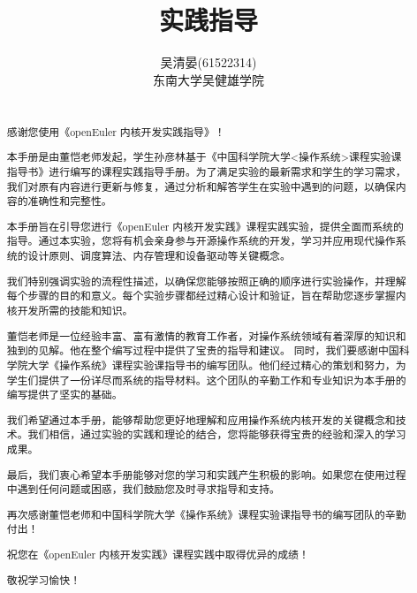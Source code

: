 \documentclass{article}
\title{实践指导}
\author{吴清晏(61522314) \\ 东南大学吴健雄学院}
\date{}
\begin{document}
\maketitle

\newpage
\renewcommand{\abstractname}{\LARGE\textbf{前言}}
\begin{abstract}\large

	~\\
	感谢您使用《openEuler 内核开发实践指导》！

	本手册是由董恺老师发起，学生孙彦林基于《中国科学院大学<操作系统>课程实验课指导书》进行编写的课程实践指导手册。为了满足实验的最新需求和学生的学习需求，我们对原有内容进行更新与修复，通过分析和解答学生在实验中遇到的问题，以确保内容的准确性和完整性。

	本手册旨在引导您进行《openEuler 内核开发实践》课程实践实验，提供全面而系统的指导。通过本实验，您将有机会亲身参与开源操作系统的开发，学习并应用现代操作系统的设计原则、调度算法、内存管理和设备驱动等关键概念。

	我们特别强调实验的流程性描述，以确保您能够按照正确的顺序进行实验操作，并理解每个步骤的目的和意义。每个实验步骤都经过精心设计和验证，旨在帮助您逐步掌握内核开发所需的技能和知识。

	董恺老师是一位经验丰富、富有激情的教育工作者，对操作系统领域有着深厚的知识和独到的见解。他在整个编写过程中提供了宝贵的指导和建议。 同时，我们要感谢中国科学院大学《操作系统》课程实验课指导书的编写团队。他们经过精心的策划和努力，为学生们提供了一份详尽而系统的指导材料。这个团队的辛勤工作和专业知识为本手册的编写提供了坚实的基础。

	我们希望通过本手册，能够帮助您更好地理解和应用操作系统内核开发的关键概念和技术。我们相信，通过实验的实践和理论的结合，您将能够获得宝贵的经验和深入的学习成果。

	最后，我们衷心希望本手册能够对您的学习和实践产生积极的影响。如果您在使用过程中遇到任何问题或困惑，我们鼓励您及时寻求指导和支持。

	再次感谢董恺老师和中国科学院大学《操作系统》课程实验课指导书的编写团队的辛勤付出！

	祝您在《openEuler 内核开发实践》课程实践中取得优异的成绩！

	敬祝学习愉快！
\end{abstract}

\newpage
\begin{center}
	\tableofcontents
\end{center}

\newpage

\setcounter{page}{1}
\pagestyle{headings}
\end{document}
